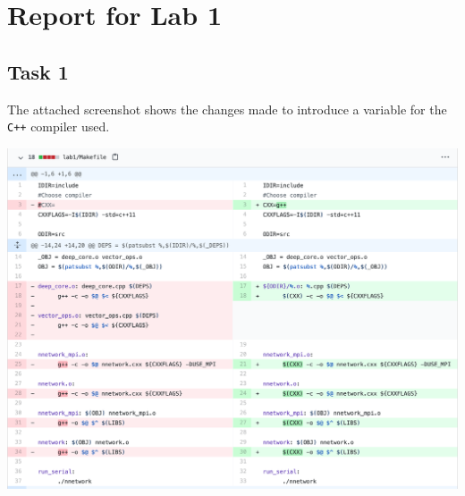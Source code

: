 \documentclass[a4paper, DIV12, headsepline]{scrartcl}
\begin{document}
\section*{Report for Lab 1}
\subsection*{Task 1}
The attached screenshot shows the changes made to introduce a variable for the \texttt{C++} compiler used.
\begin{center}
	\includegraphics[scale=0.3]{task1diff}
\end{center}
\end{document}
